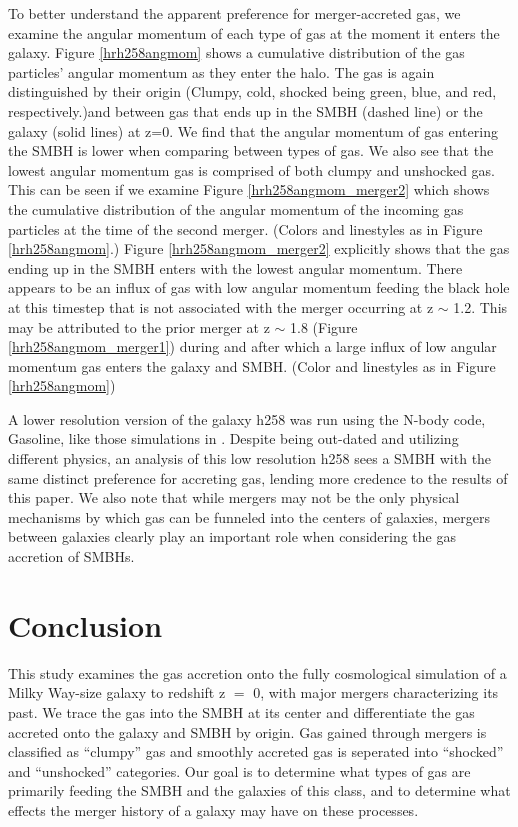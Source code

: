 \documentclass[manuscript]{aastex}
\begin{document}
To better understand the apparent preference for merger-accreted gas, we examine the angular momentum of each type of gas at the moment it enters the galaxy. Figure \ref{hrh258angmom} shows a cumulative distribution of the gas particles' angular momentum as they enter the halo. The gas is again distinguished by their origin (Clumpy, cold, shocked being green, blue, and red, respectively.)and between gas that ends up in the SMBH (dashed line) or the galaxy (solid lines) at z=0. We find that the angular momentum of gas entering the SMBH is lower when comparing between types of gas. We also see that the lowest angular momentum gas is comprised of both clumpy and unshocked gas. This can be seen if we examine Figure \ref{hrh258angmom_merger2} which shows the cumulative distribution of the angular momentum of the incoming gas particles at the time of the second merger. (Colors and linestyles as in Figure \ref{hrh258angmom}.) Figure \ref{hrh258angmom_merger2} explicitly shows that the gas ending up in the SMBH enters with the lowest angular momentum. There appears to be an influx of gas with low angular momentum feeding the black hole at this timestep that is not associated with the merger occurring at z $\sim$ 1.2. This may be attributed to the prior merger at z $\sim$ 1.8 (Figure \ref{hrh258angmom_merger1}) during and after which a large influx of low angular momentum gas enters the galaxy and SMBH. (Color and linestyles as in Figure \ref{hrh258angmom}) 

A lower resolution version of the galaxy h258 was run using the N-body code, Gasoline, like those simulations in \cite{Bellovary2013}. Despite being out-dated and utilizing different physics, an analysis of this low resolution h258 sees a SMBH with the same distinct preference for accreting gas, lending more credence to the results of this paper. We also note that while mergers may not be the only physical mechanisms by which gas can be funneled into the centers of galaxies, mergers between galaxies clearly play an important role when considering the gas accretion of SMBHs.




\section{Conclusion}
This study examines the gas accretion onto the fully cosmological simulation of a Milky Way-size galaxy to redshift z $=$ 0, with major mergers characterizing its past. We trace the gas into the SMBH at its center and differentiate the gas accreted onto the galaxy and SMBH by origin. Gas gained through mergers is classified as ``clumpy'' gas and smoothly accreted gas is seperated into ``shocked'' and ``unshocked'' categories. Our goal is to determine what types of gas are primarily feeding the SMBH and the galaxies of this class, and to determine what effects the merger history of a galaxy may have on these processes.
\end{document}
